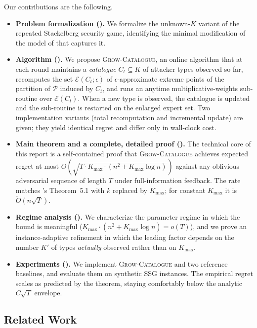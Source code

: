 \documentclass[letterpaper,9pt,twocolumn]{extarticle}
\newcommand{\cP}{\mathcal{P}}
\newcommand{\cE}{\mathcal{E}}
\newcommand{\Kmax}{K_{\max}}
\theoremstyle{plain}
\theoremstyle{definition}
\theoremstyle{remark}
\begin{document}
Our contributions are the following.
\begin{itemize}[leftmargin=1.1em,itemsep=0.10em,topsep=0.2em]
  \item \textbf{Problem formalization ().}
    We formalize the unknown-$K$ variant of the repeated Stackelberg
    security game, identifying the minimal modification of the model of
    \citet{balcan2015} that captures it.
  \item \textbf{Algorithm ().}
    We propose \textsc{Grow-Catalogue}, an online algorithm that at each
    round maintains a \emph{catalogue} $C_t\subseteq K$ of attacker types
    observed so far, recomputes the set $\cE(C_t;\epsilon)$ of
    $\epsilon$-approximate extreme points of the partition of $\cP$
    induced by $C_t$, and runs an anytime multiplicative-weights
    sub-routine over $\cE(C_t)$. When a new type is observed, the
    catalogue is updated and the sub-routine is restarted on the enlarged
    expert set. Two implementation variants (total recomputation and
    incremental update) are given; they yield identical regret and differ
    only in wall-clock cost.
  \item \textbf{Main theorem and a complete, detailed proof
    ().}
    The technical core of this report is a self-contained proof that
    \textsc{Grow-Catalogue} achieves expected regret at most
    $O(\sqrt{T\cdot\Kmax\cdot(n^2+\Kmax\log n)})$ against any oblivious
    adversarial sequence of length $T$ under full-information feedback.
    The rate matches \citeauthor{balcan2015}'s
    Theorem~5.1 with $k$ replaced by $\Kmax$; for constant $\Kmax$ it
    is $\tilde O(n\sqrt T)$.
  \item \textbf{Regime analysis ().}
    We characterize the parameter regime in which the bound is meaningful
    ($\Kmax\cdot(n^2+\Kmax\log n)=o(T)$), and we prove an
    instance-adaptive refinement in which the leading factor depends on
    the number $K'$ of types \emph{actually} observed rather than on
    $\Kmax$.
  \item \textbf{Experiments ().}
    We implement \textsc{Grow-Catalogue} and two reference baselines, and
    evaluate them on synthetic SSG instances. The empirical regret scales
    as predicted by the theorem, staying comfortably below the analytic
    $C\sqrt{T}$ envelope.
\end{itemize}

\subsection{Related Work}
\label{sec:related}
\end{document}
